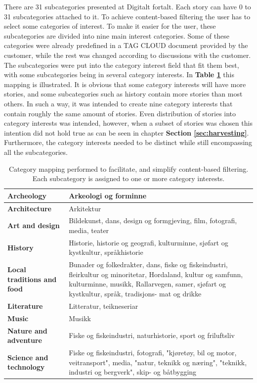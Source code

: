 There are 31 subcategories presented at Digitalt fortalt. Each story can have 0 to 31 subcategories attached to it. To achieve content-based filtering the user has to select some categories of interest. To make it easier for the user, these subcategories are divided into nine main interest categories. Some of these categories were already predefined in a TAG CLOUD document provided by the customer, while the rest was changed according to discussions with the customer. The subcategories were put into the category interest field that fit them best, with some subcategories being in several category interests. In \textbf{Table \ref{Tab:categorymapping}} this mapping is illustrated. It is obvious that some category interests will have more stories, and some subcategories such as history contain more stories than most others. In such a way, it was intended to create nine category interests that contain roughly the same amount of stories. Even distribution of stories into category interests was intended, however, when a subset of stories was chosen this intention did not hold true as can be seen in chapter \textbf{Section \ref{sec:harvesting}}. Furthermore, the category interests needed to be distinct while still encompassing all the subcategories. 

\begin{table}[!h]
	\begin{center}
		\caption{Category mapping performed to facilitate, and simplify content-based filtering. Each subcategory is assigned to one or more category interests.}
		\label{Tab:categorymapping}
		\begin{tabular}{ | p{5cm} | p{12cm}|}
			\hline
			\textbf{Archeology} & Arkeologi og forminne \\ \hline
			\textbf{Architecture} & Arkitektur \\ \hline
			\textbf{Art and design} & Bildekunst, dans, design og formgjeving, film, fotografi, media, teater \\ \hline
			\textbf{History} & Historie, historie og geografi, kulturminne, sjøfart og kystkultur, språkhistorie \\ \hline
			\textbf{Local traditions and food} & Bunader og folkedrakter, dans, fiske og fiskeindustri, fleirkultur og minoritetar, Hordaland, kultur og samfunn, kulturminne, musikk, Rallarvegen, samer, sjøfart og kystkultur, språk, tradisjons- mat og drikke \\ \hline
			\textbf{Literature } & Litteratur, teikneseriar \\ \hline
			\textbf{Music} & Musikk \\ \hline
			\textbf{Nature and adventure} & Fiske og fiskeindustri, naturhistorie, sport og friluftsliv \\ \hline
			\textbf{Science and technology} & Fiske og fiskeindustri, fotografi, "kjøretøy, bil og motor, veitransport", media, "natur, teknikk og næring", "teknikk, industri og bergverk", skip- og båtbygging \\ \hline
		\end{tabular}
	\end{center}
\end{table}


